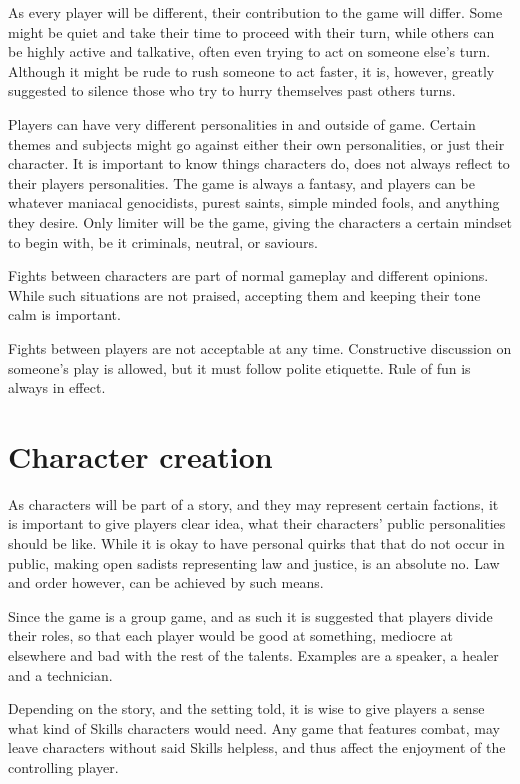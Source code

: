 \documentclass[11pt,a4paper,twocolumn]{book}
\begin{document}
    As every player will be different, their contribution to the game will differ. Some might be quiet and take their time to proceed with their turn, while others can be highly active and talkative, often even trying to act on someone else's turn. Although it might be rude to rush someone to act faster, it is, however, greatly suggested to silence those who try to hurry themselves past others turns.
    
    Players can have very different personalities in and outside of game. Certain themes and subjects might go against either their own personalities, or just their character. It is important to know things characters do, does not always reflect to their players personalities. The game is always a fantasy, and players can be whatever maniacal genocidists, purest saints, simple minded fools, and anything they desire. Only limiter will be the game, giving the characters a certain mindset to begin with, be it criminals, neutral, or saviours.
    
    Fights between characters are part of normal gameplay and different opinions. While such situations are not praised, accepting them and keeping their tone calm is important.
    
    Fights between players are not acceptable at any time. Constructive discussion on someone's play is allowed, but it must follow polite etiquette. Rule of fun is always in effect.
    
    \section*{Character creation}
    As characters will be part of a story, and they may represent certain factions, it is important to give players clear idea, what their characters' public personalities should be like. While it is okay to have personal quirks that that do not occur in public, making open sadists representing law and justice, is an absolute no. Law and order however, can be achieved by such means.  
    
    Since the game is a group game, and as such it is suggested that players divide their roles, so that each player would be good at something, mediocre at elsewhere and bad with the rest of the talents. Examples are a speaker, a healer and a technician.
    
    Depending on the story, and the setting told, it is wise to give players a sense what kind of Skills characters would need. Any game that features combat, may leave characters without said Skills helpless, and thus affect the enjoyment of the controlling player.
    
\end{document}

